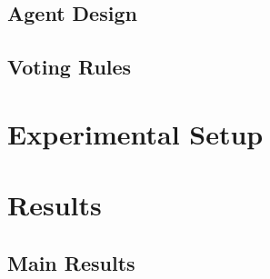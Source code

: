 \documentclass[sigconf]{aamas}
\begin{document}
\subsection{Agent Design}

\subsection{Voting Rules}

\section{Experimental Setup}


\section{Results}

\subsection{Main Results}
\end{document}
